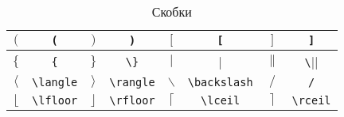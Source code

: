 \begin{table}
	\begin{tabular}{|c|c||c|c||c|c||c|c|}
		\hline $($ & \Verb|(| 
		& $)$ & \Verb|)| 
		& $[$ & \Verb|[| 
		& $]$ & \Verb|]| \\
		\hline $\{$ & \Verb|{|
		& $\}$ & \Verb|\}| 
		& $|$ & \Verb||| 
		& $\|$ & \Verb|\|| \\
		\hline $\langle$ & \Verb|\langle| 
		& $\rangle$ & \Verb|\rangle| 
		& $\backslash$ & \Verb|\backslash|  
		& $/$ & \Verb|/| \\
		\hline $\lfloor$ & \Verb|\lfloor|
		& $\rfloor$ & \Verb|\rfloor| 
		& $\lceil$ & \Verb|\lceil| 
		& $\rceil$ & \Verb|\rceil| \\ 
		\hline 
	\end{tabular}
	\caption{Скобки}
\end{table}